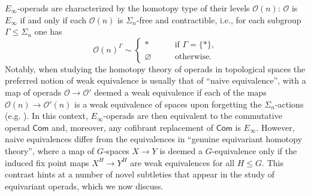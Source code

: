 \documentclass[a4paper,10pt
,draft
]{article}%
\numberwithin{equation}{section}
\numberwithin{figure}{section}
\theoremstyle{definition} %
\renewcommand{\O}{\ensuremath{\mathcal O}}
\newcommand{\1}{\ensuremath{\mathbbm 1}}%
\begin{document}
$E_\infty$-operads are characterized by the homotopy type of their levels $\O(n)$: $\O$ is $E_\infty$ if and only if each $\O(n)$ is $\Sigma_n$-free and contractible, i.e., for each subgroup $\Gamma \leq \Sigma_n$ one has
\[
\O(n)^\Gamma \sim
\begin{cases}
        * & \text{if } \Gamma = \{*\} , \\
        \varnothing \qquad & \text{otherwise.}
\end{cases}
\]
Notably, when studying the homotopy theory of operads in topological spaces
the preferred notion of weak equivalence is 
usually that of ``naive equivalence'',
with a map of operads 
$\O \to \O'$
deemed a weak equivalence if each of the maps
$\O(n) \to \O'(n)$
is a weak equivalence of spaces
upon forgetting the $\Sigma_n$-actions (e.g. \cite[3.2]{BM03}).
In this context, $E_\infty$-operads are then equivalent to the commutative operad $\mathsf{Com}$
and, moreover, 
any cofibrant replacement of $\mathsf{Com}$
is $E_{\infty}$.
However, naive equivalences differ from the equivalences in ``genuine equivariant homotopy theory'', where a map of $G$-spaces $X \to Y$ is deemed a $G$-equivalence only if the induced fix point maps $X^H \to Y^H$ are weak equivalences for all $H \leq G$.
This contrast hints at a number of novel subtleties that appear in the study of equivariant operads, which we now discuss.
\end{document}
